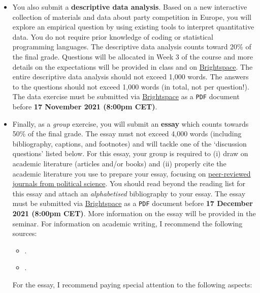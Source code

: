 \documentclass[abstract=on,parskip=full,headings=standardclasses,fontsize=11pt,paper=a4]{scrartcl}
\begin{document}
\begin{itemize}
\item You also submit a \textbf{descriptive data analysis}. Based on a new interactive collection of materials and data about party competition in Europe, you will explore an empirical question by using existing tools to interpret quantitative data. You do not require prior knowledge of coding or statistical programming languages. The descriptive data analysis counts toward 20\% of the final grade. Questions will be allocated in Week 3 of the course and more details on the expectations will be provided in class and on \href{https://brightspace.ucd.ie}{Brightspace}. The entire descriptive data analysis should not exceed 1,000 words.
The answers to the questions should not exceed 1,000 words (in total, not per question!). The data exercise must be submitted via \href{https://brightspace.ucd.ie}{Brightspace} as a \texttt{PDF} document before \textbf{17 November 2021 (8:00pm CET)}.

\item Finally, as a \textit{group} exercise, you will submit an \textbf{essay}  which counts towards 50\% of the final grade. The essay must not exceed 4,000 words  (including bibliography, captions, and footnotes) and  will tackle one of the `discussion questions' listed below. For this essay, your group is required to (i) draw on academic literature (articles and/or books) and (ii) properly cite the academic literature you use to prepare your essay, focusing on \href{https://ooir.org/journals.php?category=polisci}{peer-reviewed journals from political science}. You should read beyond the reading list for this essay and attach an \textit{alphabetised}  bibliography to your essay. The essay must be submitted via \href{https://brightspace.ucd.ie}{Brightspace} as a \texttt{PDF} document before \textbf{17 December 2021 (8:00pm CET)}. More information on the essay will be provided in the seminar. For information on academic writing, I recommend the following sources:

\begin{itemize}
\item {}.
\item {}.
\end{itemize}


For the essay, I recommend paying special attention to the following aspects:


\end{itemize}
\end{document}
